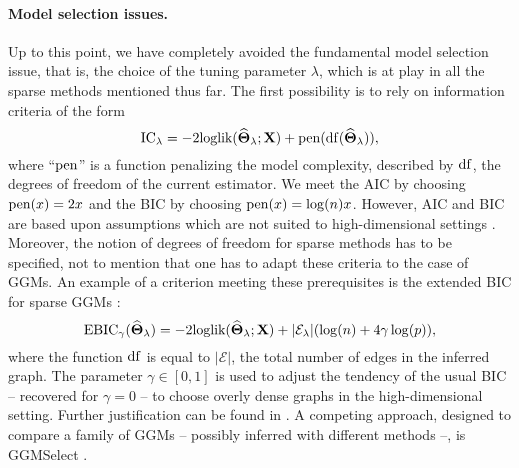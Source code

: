 
\paragraph*{Model  selection  issues.}   Up  to this  point,  we  have
completely avoided the fundamental model selection issue, that is, the
choice of the tuning parameter $\lambda$,  which is at play in all the
sparse methods mentioned  thus far.  The first possibility  is to rely
on information criteria of the form
\begin{equation*}
  \textrm{IC}_\lambda = - 2 \textrm{loglik}(\widehat{\boldsymbol\Theta}_\lambda;\mathbf{X}) + \mathrm{pen}(\mathrm{df}(\widehat{\boldsymbol\Theta}_\lambda)),
\end{equation*}
where ``$\mathrm{pen}$'' is a function penalizing the model complexity,
described by $\mathrm{df}$, the degrees of freedom of the current estimator.
We meet the AIC by choosing $\mathrm{pen}(x) = 2 x $ and the BIC by choosing
$\mathrm{pen}(x) = \log(n) x$.  However, AIC and BIC are based upon
assumptions which are not suited to high-dimensional settings
\citep[see][]{2012_SS_Giraud}.  Moreover, the notion of degrees of
freedom for sparse methods has to be specified, not to mention that
one has to adapt these criteria to the case of GGMs.  An example of a
criterion meeting these prerequisites is the extended BIC for sparse
GGMs \citep{foygel2010extended}:
\begin{equation}
  \label{eq:EBIC_ggm}
  \text{EBIC}_\gamma(\widehat{\invcov}_\lambda)  =   -2 \textrm{loglik}
  (\widehat{\invcov}_\lambda;\bX) + |\mathcal{E}_\lambda| (\log(n) + 4 \gamma \log(p) ),
\end{equation}
where the function $\mathrm{df}$ is equal to $|\mathcal{E}|$, the total number
of edges  in the  inferred graph. The  parameter $\gamma\in  [0,1]$ is
used  to  adjust the  tendency  of  the  usual  BIC --  recovered  for
$\gamma=0$ --  to choose overly  dense graphs in  the high-dimensional
setting.      Further     justification     can    be     found     in
\cite{foygel2010extended}. A competing approach, designed to compare a
family  of GGMs -- possibly  inferred  with different  methods --,  is
GGMSelect \cite{2012_SAGMB_Giraud,giraud2008estimation}.

